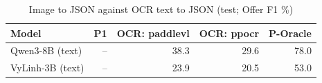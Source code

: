 \begin{table}[t]
\centering
\caption{Image to JSON against OCR text to JSON (test; Offer F1 \%)}
\label{tab:cascade}
\small
\begin{tabular}{lrrrr}
\toprule
Model & P1 & OCR: paddlevl & OCR: ppocr & P-Oracle \\
\midrule
Qwen3-8B (text) & – & 38.3 & 29.6 & 78.0 \\
VyLinh-3B (text) & – & 23.9 & 20.5 & 53.0 \\
\bottomrule
\end{tabular}
\par{}
\end{table}
